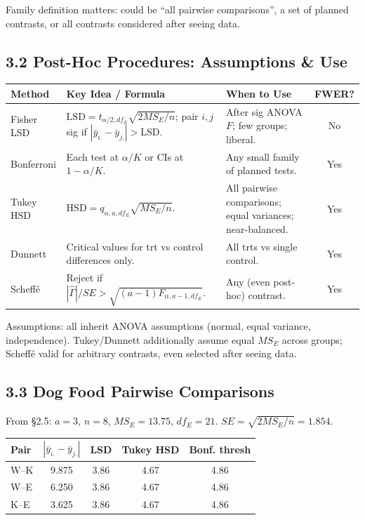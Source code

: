 \documentclass[9pt,letterpaper]{article}
\begin{document}
Family definition matters: could be ``all pairwise comparisons'', a set of planned contrasts, or all contrasts considered after seeing data.

\subsection{3.2 Post-Hoc Procedures: Assumptions \& Use}

\begin{center}\small
\begin{tabular}{@{}p{1.7cm}p{4.8cm}p{3.6cm}c@{}}
\toprule
Method & Key Idea / Formula & When to Use & FWER? \\
\midrule
Fisher LSD & $\text{LSD}=t_{\alpha/2,df_E}\sqrt{2MS_E/n}$; pair $i,j$ sig if $|\bar{y}_{i.}-\bar{y}_{j.}|>\text{LSD}$. & After sig ANOVA $F$; few groups; liberal. & No \\
Bonferroni & Each test at $\alpha/K$ or CIs at $1-\alpha/K$. & Any small family of planned tests. & Yes \\
Tukey HSD & $\text{HSD}=q_{\alpha,a,df_E}\sqrt{MS_E/n}$. & All pairwise comparisons; equal variances; near-balanced. & Yes \\
Dunnett & Critical values for trt vs control differences only. & All trts vs single control. & Yes \\
Scheff\'e & Reject if $|\hat{\Gamma}|/SE>\sqrt{(a-1)F_{\alpha,a-1,df_E}}$. & Any (even post-hoc) contrast. & Yes \\
\bottomrule
\end{tabular}
\end{center}

Assumptions: all inherit ANOVA assumptions (normal, equal variance, independence). Tukey/Dunnett additionally assume equal $MS_E$ across groups; Scheff\'e valid for arbitrary contrasts, even selected after seeing data.

\subsection{3.3 Dog Food Pairwise Comparisons}

From \S2.5: $a=3$, $n=8$, $MS_E=13.75$, $df_E=21$. $SE=\sqrt{2MS_E/n}=1.854$.

\begin{center}\small
\begin{tabular}{@{}lcccc@{}}
\toprule
Pair & $|\bar{y}_{i.}-\bar{y}_{j.}|$ & LSD & Tukey HSD & Bonf. thresh \\
\midrule
W--K & 9.875 & 3.86 & 4.67 & 4.86 \\
W--E & 6.250 & 3.86 & 4.67 & 4.86 \\
K--E & 3.625 & 3.86 & 4.67 & 4.86 \\
\bottomrule
\end{tabular}
\end{center}
\end{document}
